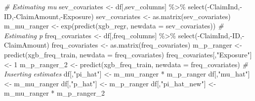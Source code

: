 \documentclass[
]{article}
\newenvironment{Shaded}{\begin{snugshade}}{\end{snugshade}}
\newcommand{\AttributeTok}[1]{\textcolor[rgb]{0.77,0.63,0.00}{#1}}
\newcommand{\CommentTok}[1]{\textcolor[rgb]{0.56,0.35,0.01}{\textit{#1}}}
\newcommand{\DecValTok}[1]{\textcolor[rgb]{0.00,0.00,0.81}{#1}}
\newcommand{\FunctionTok}[1]{\textcolor[rgb]{0.00,0.00,0.00}{#1}}
\newcommand{\NormalTok}[1]{#1}
\newcommand{\OtherTok}[1]{\textcolor[rgb]{0.56,0.35,0.01}{#1}}
\newcommand{\SpecialCharTok}[1]{\textcolor[rgb]{0.00,0.00,0.00}{#1}}
\newcommand{\StringTok}[1]{\textcolor[rgb]{0.31,0.60,0.02}{#1}}
\begin{document}
\begin{Shaded}
\begin{Highlighting}[]
\CommentTok{\# Estimating mu}
\NormalTok{sev\_covariates }\OtherTok{\textless{}{-}}\NormalTok{ df[,sev\_columns] }\SpecialCharTok{\%\textgreater{}\%}
  \FunctionTok{select}\NormalTok{(}\SpecialCharTok{{-}}\NormalTok{ClaimInd,}\SpecialCharTok{{-}}\NormalTok{ID,}\SpecialCharTok{{-}}\NormalTok{ClaimAmount,}\SpecialCharTok{{-}}\NormalTok{Exposure)}
\NormalTok{sev\_covariates }\OtherTok{\textless{}{-}}  \FunctionTok{as.matrix}\NormalTok{(sev\_covariates)}
\NormalTok{m\_mu\_ranger }\OtherTok{\textless{}{-}} \FunctionTok{exp}\NormalTok{(}\FunctionTok{predict}\NormalTok{(xgb\_regr, }\AttributeTok{newdata =}\NormalTok{ sev\_covariates))}
\CommentTok{\# Estimating p}
\NormalTok{freq\_covariates }\OtherTok{\textless{}{-}}\NormalTok{ df[,freq\_columns] }\SpecialCharTok{\%\textgreater{}\%}
  \FunctionTok{select}\NormalTok{(}\SpecialCharTok{{-}}\NormalTok{ClaimInd,}\SpecialCharTok{{-}}\NormalTok{ID,}\SpecialCharTok{{-}}\NormalTok{ClaimAmount)}
\NormalTok{freq\_covariates }\OtherTok{\textless{}{-}} \FunctionTok{as.matrix}\NormalTok{(freq\_covariates)}
\NormalTok{m\_p\_ranger }\OtherTok{\textless{}{-}} \FunctionTok{predict}\NormalTok{(xgb\_freq\_train, }\AttributeTok{newdata =}\NormalTok{ freq\_covariates)}
\NormalTok{freq\_covariates[,}\StringTok{"Exposure"}\NormalTok{] }\OtherTok{\textless{}{-}} \DecValTok{1}
\NormalTok{m\_p\_ranger\_2 }\OtherTok{\textless{}{-}} \FunctionTok{predict}\NormalTok{(xgb\_freq\_train, }\AttributeTok{newdata =}\NormalTok{ freq\_covariates)}
\CommentTok{\# Inserting estimates}
\NormalTok{df[,}\StringTok{"pi\_hat"}\NormalTok{] }\OtherTok{\textless{}{-}}\NormalTok{ m\_mu\_ranger }\SpecialCharTok{*}\NormalTok{ m\_p\_ranger}
\NormalTok{df[,}\StringTok{"mu\_hat"}\NormalTok{] }\OtherTok{\textless{}{-}}\NormalTok{ m\_mu\_ranger}
\NormalTok{df[,}\StringTok{"p\_hat"}\NormalTok{] }\OtherTok{\textless{}{-}}\NormalTok{ m\_p\_ranger}
\NormalTok{df[,}\StringTok{"pi\_hat\_new"}\NormalTok{] }\OtherTok{\textless{}{-}}\NormalTok{ m\_mu\_ranger }\SpecialCharTok{*}\NormalTok{ m\_p\_ranger\_2}
\end{Highlighting}
\end{Shaded}
\end{document}
